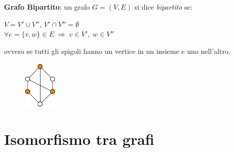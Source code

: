 \newpage
\begin{flushleft}

    \textbf{Grafo Bipartito}: un grafo $G = (V, E)$ si dice \textit{bipartito} se:

    {\centering
        $V = V' \cup V''$, $V' \cap V'' = \emptyset$ \\
        $\forall e = \{v, w\} \in E \; \Rightarrow \; v \in V', \; w \in V''$
    \par}
    ovvero se tutti gli spigoli hanno un vertice in un insieme e uno nell'altro.

    \begin{figure}[h]
        \centering
        \includegraphics[width=0.15\textwidth]{img/grafo_bip}
    \end{figure}

\end{flushleft}

\section{Isomorfismo tra grafi}


